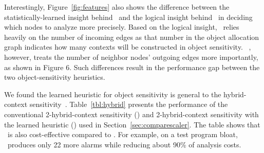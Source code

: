 Interestingly, Figure~\ref{fig:features} also shows the difference between the statistically-learned insight behind \OurCtx~and the logical insight behind \Scaler~in deciding which nodes to analyze more precisely.
Based on the logical insight, \Scaler~relies heavily on the number of incoming edges
as that number in the object allocation graph indicates %
how many contexts will be constructed in object sensitivity.%
~\ourtool, however, treats the number of neighbor nodes' outgoing edges more importantly, as shown in Figure 6.
Such differences result in the performance gap between the two object-sensitivity heuristics.

We found the learned heuristic for object sensitivity is general to the hybrid-context sensitivity~\cite{kastrinis2013hybrid}. Table~\ref{tbl:hybrid} presents the performance of the conventional 2-hybrid-context sensitivity (\twosobjH) and
2-hybrid-context sensitivity with the learned heuristic (\ourtool) used in Section~\ref{sec:comparescaler}.
The table shows that \ourtool~is also cost-effective compared to \twosobjH. For example, on a test program bloat,
\ourtool~produces only 22 more alarms while reducing about 90\% of analysis costs.



